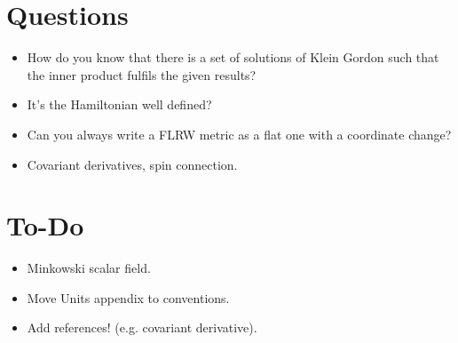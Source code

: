 \section{Questions}
\begin{itemize}
	\item How do you know that there is a set of solutions of Klein Gordon such that the inner product fulfils the given results?
	\item It's the Hamiltonian well defined?
	\item Can you always write a FLRW metric as a flat one with a coordinate change?
	\item Covariant derivatives, spin connection.
\end{itemize}
\section{To-Do}
\begin{itemize}
	\item Minkowski scalar field.
	\item Move Units appendix to conventions.
	\item Add references! (e.g. covariant derivative).
\end{itemize}